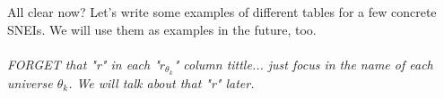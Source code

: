 	\noindent
	All clear now? Let's write some examples of different tables for a few concrete SNEIs. We will use them as examples in the future, too.
	\\\\
	
	\noindent
	\textit{FORGET that "r" in each "$r_{\theta_{k}}$" column tittle... just focus in the name of each universe $\theta_{k}$. We will talk about that "r" later.}
	\\\\
	
	
	
		
	\newpage
